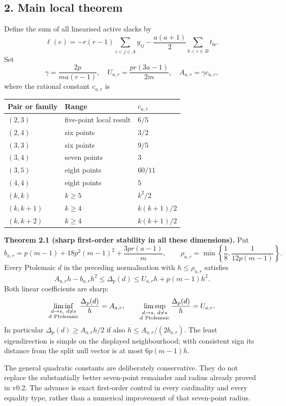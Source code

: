 \documentclass[11pt,a4paper]{article}
\newcounter{none}
\begin{document}
\subsection{2. Main local theorem}\label{main-local-theorem}

Define the sum of all linearised active slacks by
\[\ell(e)=-r(r-1)\sum_{i<j\in A}y_{ij}
-\frac{a(a+1)}2\sum_{b<c\in B}t_{bc}.\] Set
\[\gamma=\frac{2p}{ma(r-1)},\quad
U_{a,r}=\frac{pr(3a-1)}{2m},\quad A_{a,r}=\gamma c_{a,r},\] where the
rational constant \(c_{a,r}\) is

{\def\LTcaptype{none} %
\begin{longtable}[]{@{}lll@{}}
\toprule\noalign{}
Pair or family & Range & \(c_{a,r}\) \\
\midrule\noalign{}
\endhead
\bottomrule\noalign{}
\endlastfoot
\((2,3)\) & five-point local result & \(6/5\) \\
\((2,4)\) & six points & \(3/2\) \\
\((3,3)\) & six points & \(9/5\) \\
\((3,4)\) & seven points & \(3\) \\
\((3,5)\) & eight points & \(60/11\) \\
\((4,4)\) & eight points & \(5\) \\
\((k,k)\) & \(k\ge5\) & \(k^2/2\) \\
\((k,k+1)\) & \(k\ge4\) & \(k(k+1)/2\) \\
\((k,k+2)\) & \(k\ge4\) & \(k(k+1)/2\) \\
\end{longtable}
}

\textbf{Theorem 2.1 (sharp first-order stability in all these
dimensions).} Put \[b_{a,r}=p(m-1)+18p^2(m-1)^2+\frac{3pr(a-1)}m,
\qquad \rho_{a,r}=\min\left\{\frac18,\frac1{12p(m-1)}\right\}.\] Every
Ptolemaic \(d\) in the preceding normalisation with \(h\le\rho_{a,r}\)
satisfies \[\boxed{A_{a,r}h-b_{a,r}h^2\le\Delta_p(d)
\le U_{a,r}h+p(m-1)h^2.}\] Both linear coefficients are sharp:
\[\liminf_{\substack{d\to s,\ d\ne s\\d\ {\rm Ptolemaic}}}\frac{\Delta_p(d)}h=A_{a,r},
\qquad
\limsup_{\substack{d\to s,\ d\ne s\\d\ {\rm Ptolemaic}}}\frac{\Delta_p(d)}h=U_{a,r}.\]
In particular \(\Delta_p(d)\ge A_{a,r}h/2\) if also
\(h\le A_{a,r}/(2b_{a,r})\). The least eigendirection is simple on the
displayed neighbourhood; with consistent sign its distance from the
split null vector is at most \(6p(m-1)h\).

The general quadratic constants are deliberately conservative. They do
not replace the substantially better seven-point remainder and radius
already proved in v0.2. The advance is exact first-order control in
every cardinality and every equality type, rather than a numerical
improvement of that seven-point radius.
\end{document}
